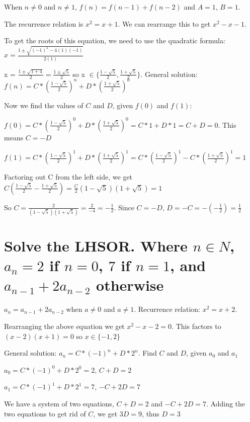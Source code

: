 \documentclass{article}
\begin{document}
When $n \neq 0$ and $n \neq 1$, $f(n) = f(n - 1) + f(n - 2)$ and $A = 1$, $B = 1$. \par
\noindent The recurrence relation is $x^{2} = x + 1$.  We can rearrange this to get $x^{2} - x - 1$. \par\vspace{0.5cm}

\noindent To get the roots of this equation, we need to use the quadratic formula: $x = \frac{1 \pm \sqrt{(-1)^{2} - 4(1)(-1)}}{2(1)}$ \par\noindent
x = $\frac{1 \pm \sqrt{1 + 4}}{2} = \frac{1 \pm \sqrt{5}}{2}$ so x $\in \{\frac{1 - \sqrt{5}}{2}, \frac{1 + \sqrt{5}}{2}\}$.  General solution: $f(n) = C*(\frac{1 - \sqrt{5}}{2})^{n} + D*(\frac{1 + \sqrt{5}}{2})^{n}$  \par\vspace{0.5cm}

\noindent Now we find the values of $C$ and $D$, given $f(0)$ and $f(1)$: \par\noindent

\noindent $f(0) = C*(\frac{1 - \sqrt{5}}{2})^{0} + D*(\frac{1 + \sqrt{5}}{2})^{0} = C*1 + D*1 = C + D = 0$.  This means $C = -D$ \par

\noindent $f(1) = C*(\frac{1 - \sqrt{5}}{2})^{1} + D*(\frac{1 + \sqrt{5}}{2})^{1} = C*(\frac{1 - \sqrt{5}}{2})^{1} - C*(\frac{1 + \sqrt{5}}{2})^{1} = 1$ \par

\noindent Factoring out C from the left side, we get $C(\frac{1 - \sqrt{5}}{2} - \frac{1 + \sqrt{5}}{2}) = \frac{C}{2}(1 - \sqrt{5})(1 + \sqrt{5}) = 1$ \par

\noindent So $C = \frac{2}{(1 - \sqrt{5})(1 + \sqrt{5})} = \frac{2}{-4} = -\frac{1}{2}$.  Since $C = -D$, $D = -C = -(-\frac{1}{2}) = \frac{1}{2}$

\section{Solve the LHSOR.  Where $n \in N$, $a_{n} = 2$ if $n = 0$, $7$ if $n = 1$, and $a_{n - 1} + 2a_{n - 2}$ otherwise}

$a_{n} = a_{n - 1} + 2a_{n - 2}$ when $a \neq 0$ and $a \neq 1$.  Recurrence relation: $x^{2} = x + 2$. \par
\noindent Rearranging the above equation we get $x^{2} - x - 2 = 0$.  This factors to $(x - 2)(x + 1) = 0$ so $x \in \{-1, 2\}$ \par

\noindent General solution: $a_{n} = C*(-1)^{n} + D*2^{n}$.  Find $C$ and $D$, given $a_{0}$ and $a_{1}$ \par
\noindent $a_{0} = C*(-1)^{0} + D*2^{0} = 2$, $C + D = 2$ \par
\noindent $a_{1} = C*(-1)^{1} + D*2^{1} = 7$, $-C + 2D = 7$ \par
\noindent We have a system of two equations, $C + D = 2$ and $-C + 2D = 7$.  Adding the two equations to get rid of $C$, we get $3D = 9$, thus $D = 3$
\end{document}
